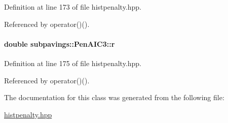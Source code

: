 \-Definition at line 173 of file histpenalty.\-hpp.



\-Referenced by operator()().

\hypertarget{classsubpavings_1_1PenAIC3_a39aa74f535a40c4f4611e8fb44d07a96}{
\paragraph[{r}]{\setlength{\rightskip}{0pt plus 5cm}double {\bf subpavings\-::\-Pen\-A\-I\-C3\-::r}}}\label{classsubpavings_1_1PenAIC3_a39aa74f535a40c4f4611e8fb44d07a96}


\-Definition at line 175 of file histpenalty.\-hpp.



\-Referenced by operator()().



\-The documentation for this class was generated from the following file\-:\begin{DoxyCompactItemize}
\item 
\hyperlink{histpenalty_8hpp}{histpenalty.\-hpp}\end{DoxyCompactItemize}

